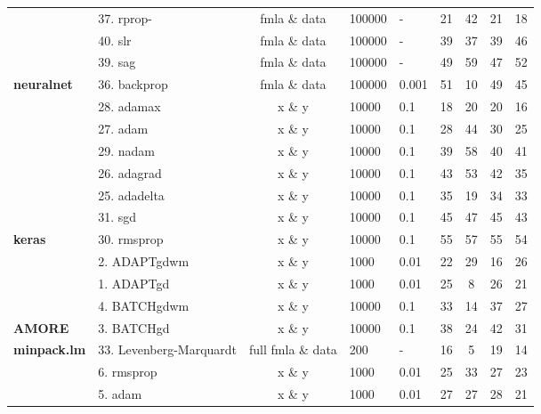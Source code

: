 \begin{Schunk}
\begin{table}[!h]
\begin{tabular}[t]{>{}llcllcccc}
 & 37. rprop- & fmla \& data & 100000 & - & 21 & 42 & 21 & 18\\

 & 40. slr & fmla \& data & 100000 & - & 39 & 37 & 39 & 46\\

 & 39. sag & fmla \& data & 100000 & - & 49 & 59 & 47 & 52\\

\multirow{-5}{*}{\raggedright\arraybackslash \textbf{neuralnet}} & 36. backprop & fmla \& data & 100000 & 0.001 & 51 & 10 & 49 & 45\\
\cmidrule{1-9}
 & 28. adamax & x \& y & 10000 & 0.1 & 18 & 20 & 20 & 16\\

 & 27. adam & x \& y & 10000 & 0.1 & 28 & 44 & 30 & 25\\

 & 29. nadam & x \& y & 10000 & 0.1 & 39 & 58 & 40 & 41\\

 & 26. adagrad & x \& y & 10000 & 0.1 & 43 & 53 & 42 & 35\\

 & 25. adadelta & x \& y & 10000 & 0.1 & 35 & 19 & 34 & 33\\

 & 31. sgd & x \& y & 10000 & 0.1 & 45 & 47 & 45 & 43\\

\multirow{-7}{*}{\raggedright\arraybackslash \textbf{keras}} & 30. rmsprop & x \& y & 10000 & 0.1 & 55 & 57 & 55 & 54\\
\cmidrule{1-9}
 & 2. ADAPTgdwm & x \& y & 1000 & 0.01 & 22 & 29 & 16 & 26\\

 & 1. ADAPTgd & x \& y & 1000 & 0.01 & 25 & 8 & 26 & 21\\

 & 4. BATCHgdwm & x \& y & 10000 & 0.1 & 33 & 14 & 37 & 27\\

\multirow{-4}{*}{\raggedright\arraybackslash \textbf{AMORE}} & 3. BATCHgd & x \& y & 10000 & 0.1 & 38 & 24 & 42 & 31\\
\cmidrule{1-9}
\textbf{minpack.lm} & 33. Levenberg-Marquardt & full fmla \& data & 200 & - & 16 & 5 & 19 & 14\\
\cmidrule{1-9}
 & 6. rmsprop & x \& y & 1000 & 0.01 & 25 & 33 & 27 & 23\\

 & 5. adam & x \& y & 1000 & 0.01 & 27 & 27 & 28 & 21\\


\end{tabular}
\end{table}
\end{Schunk}
